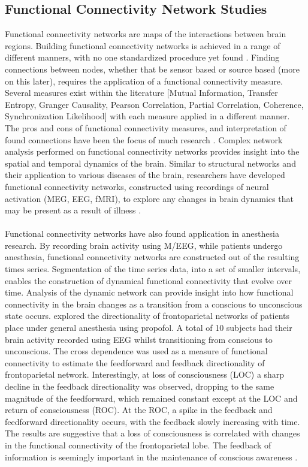 \documentclass[11pt]{article}
\begin{document}
\subsection{Functional Connectivity Network Studies}
Functional connectivity networks are maps of the interactions between brain regions. Building functional connectivity networks is achieved in a range of different manners, with no one standardized procedure yet found \citep{fornito2013graph}. Finding connections between nodes, whether that be sensor based or source based (more on this later), requires the application of a functional connectivity measure. Several measures exist within the literature [Mutual Information, Transfer Entropy, Granger Causality, Pearson Correlation, Partial Correlation, Coherence, Synchronization Likelihood] with each measure applied in a different manner. The pros and cons of functional connectivity measures, and interpretation of found connections have been the focus of much research \citep{jal1,darvas,wangrev}. Complex network analysis performed on functional connectivity networks provides insight into the spatial and temporal dynamics of the brain. Similar to structural networks and their application to various diseases of the brain, researchers have developed functional connectivity networks, constructed using recordings of neural activation (MEG, EEG, fMRI), to explore any changes in brain dynamics that may be present as a result of illness \citep{stamfc, lynfc}.\\
\\ 
Functional connectivity networks have also found application in anesthesia research. By recording brain activity using M/EEG, while patients undergo anesthesia, functional connectivity networks are constructed out of the resulting times series. Segmentation of the time series data, into a set of smaller intervals, enables the construction of dynamical functional connectivity that evolve over time. Analysis of the dynamic network can provide insight into how functional connectivity in the brain changes as a transition from a conscious to unconscious state occurs. \citet{leeold} explored the directionality of frontoparietal networks of patients place under general anesthesia using propofol. A total of 10 subjects had their brain activity recorded using EEG whilst transitioning from conscious to unconscious. The cross dependence was used as a measure of functional connectivity to estimate the feedforward and feedback directionality of frontoparietal network. Interestingly, at loss of consciousness (LOC) a sharp decline in the feedback directionality was observed, dropping to the same magnitude of the feedforward, which remained constant except at the LOC and return of consciousness (ROC). At the ROC, a spike in the feedback and feedforward directionality occurs, with the feedback slowly increasing with time. The results are suggestive that a loss of consciousness is correlated with changes in the functional connectivity of the frontoparietal lobe. The feedback of information is seemingly important in the maintenance of conscious awareness \citep{leeold}.\\
\end{document}
